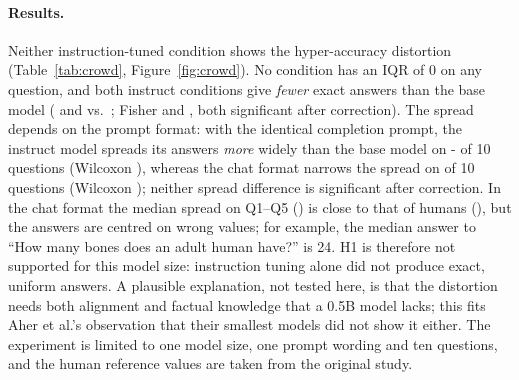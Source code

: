\paragraph{Results.} Neither instruction-tuned condition shows the hyper-accuracy distortion (Table~\ref{tab:crowd}, Figure~\ref{fig:crowd}). No condition has an IQR of 0 on any question, and both instruct conditions give \emph{fewer} exact answers than the base model (\xInstExact{} and \xChatExact{} vs.\ \xBaseExact; Fisher \xInstFisherP{} and \xChatFisherP{}, both significant after correction). The spread depends on the prompt format: with the identical completion prompt, the instruct model spreads its answers \emph{more} widely than the base model on \the{}-\xInstLower\relax{} of 10 questions (Wilcoxon \xInstWilcP), whereas the chat format narrows the spread on \xChatLower{} of 10 questions (Wilcoxon \xChatWilcP); neither spread difference is significant after correction. In the chat format the median spread on Q1--Q5 (\xChatNIQRfive) is close to that of humans (\xHumNIQRfive), but the answers are centred on wrong values; for example, the median answer to ``How many bones does an adult human have?'' is 24. %
H1 is therefore not supported for this model size: instruction tuning alone did not produce exact, uniform answers. A plausible explanation, not tested here, is that the distortion needs both alignment and factual knowledge that a 0.5B model lacks; this fits Aher et al.'s observation that their smallest models did not show it either. %
The experiment is limited to one model size, one prompt wording and ten questions, and the human reference values are taken from the original study.
